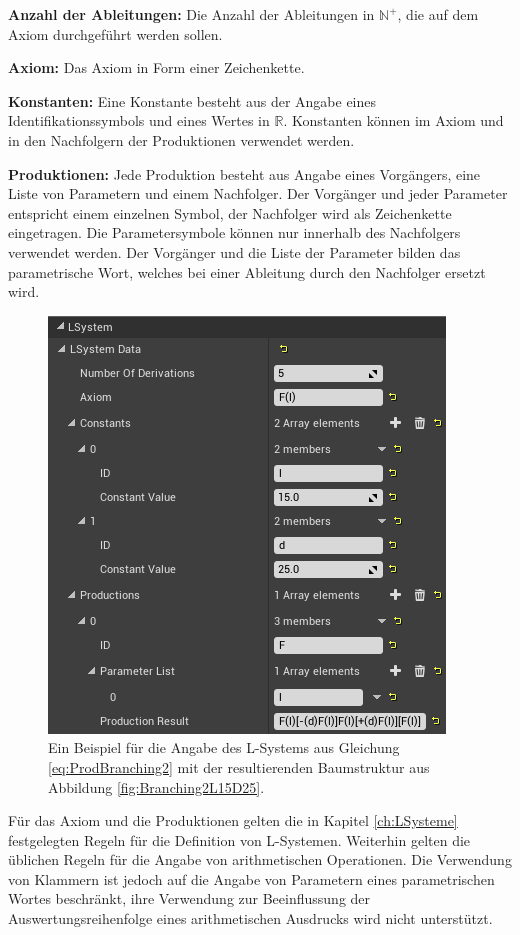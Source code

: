 \begin{description}
	\item \textbf{Anzahl der Ableitungen:} Die Anzahl der Ableitungen in $\mathbb{N}^+$, die auf dem Axiom durchgeführt werden sollen. \\
	
	\item \textbf{Axiom:} Das Axiom in Form einer Zeichenkette. \\
	
	\item \textbf{Konstanten:} Eine Konstante besteht aus der Angabe eines Identifikationssymbols und eines Wertes in $\mathbb{R}$. Konstanten können im Axiom und in den Nachfolgern der Produktionen verwendet werden.\\	
	
	\item \textbf{Produktionen:} Jede Produktion besteht aus Angabe eines Vorgängers, eine Liste von Parametern und einem Nachfolger. Der Vorgänger und jeder Parameter entspricht einem einzelnen Symbol, der Nachfolger wird als Zeichenkette eingetragen. Die Parametersymbole können nur innerhalb des Nachfolgers verwendet werden. Der Vorgänger und die Liste der Parameter bilden das parametrische Wort, welches bei einer Ableitung durch den Nachfolger ersetzt wird.
\end{description}
\begin{figure} [hbtp]
	\centering
	\includegraphics[height=0.4\textheight]{images/LS_ExampleUE4UI.png}
	\caption{Ein Beispiel für die Angabe des L-Systems aus Gleichung \ref{eq:ProdBranching2} mit der resultierenden Baumstruktur aus Abbildung \ref{fig:Branching2L15D25}.}
	\label{fig:LS_ExampleUE4UI}
\end{figure}
Für das Axiom und die Produktionen gelten die in Kapitel \ref{ch:LSysteme} festgelegten Regeln für die Definition von L-Systemen. Weiterhin gelten die üblichen Regeln für die Angabe von arithmetischen Operationen. Die Verwendung von Klammern ist jedoch auf die Angabe von Parametern eines parametrischen Wortes beschränkt, ihre Verwendung zur Beeinflussung der Auswertungsreihenfolge eines arithmetischen Ausdrucks wird nicht unterstützt.

